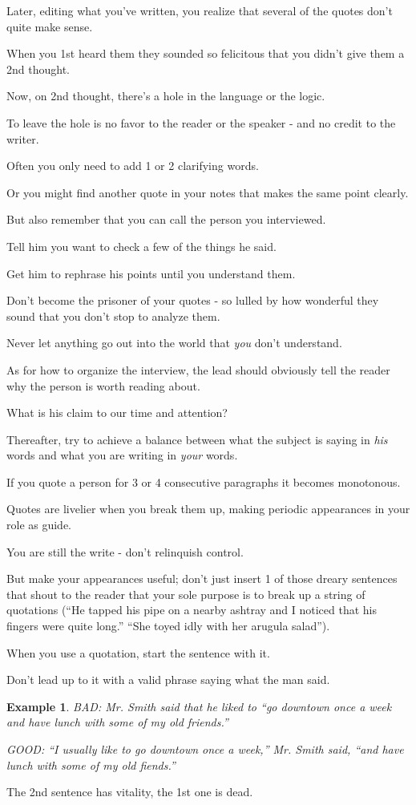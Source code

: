 \documentclass{book}
\numberwithin{equation}{section}
\newtheorem{example}{Example}[chapter]
\begin{document}
Later, editing what you've written, you realize that several of the quotes don't quite make sense.

When you 1st heard them they sounded so felicitous that you didn't give them a 2nd thought.

Now, on 2nd thought, there's a hole in the language or the logic.

To leave the hole is no favor to the reader or the speaker - and no credit to the writer.

Often you only need to add 1 or 2 clarifying words.

Or you might find another quote in your notes that makes the same point clearly.

But also remember that you can call the person you interviewed.

Tell him you want to check a few of the things he said.

Get him to rephrase his points until you understand them.

Don't become the prisoner of your quotes - so lulled by how wonderful they sound that you don't stop to analyze them.

Never let anything go out into the world that \textit{you} don't understand.

%
As for how to organize the interview, the lead should obviously tell the reader why the person is worth reading about.

What is his claim to our time and attention?

Thereafter, try to achieve a balance between what the subject is saying in \textit{his} words and what you are writing in \textit{your} words.

If you quote a person for 3 or 4 consecutive paragraphs it becomes monotonous.

Quotes are livelier when you break them up, making periodic appearances in your role as guide.

You are still the write - don't relinquish control.

But make your appearances useful; don't just insert 1 of those dreary sentences that shout to the reader that your sole purpose is to break up a string of quotations (``He tapped his pipe on a nearby ashtray and I noticed that his fingers were quite long.'' ``She toyed idly with her arugula salad'').

%
When you use a quotation, start the sentence with it.

Don't lead up to it with a valid phrase saying what the man said.
\begin{example}
    BAD: Mr. Smith said that he liked to ``go downtown once a week and have lunch with some of my old friends.''
    
    GOOD: ``I usually like to go downtown once a week,'' Mr. Smith said, ``and have lunch with some of my old fiends.''
\end{example}
The 2nd sentence has vitality, the 1st one is dead.
\end{document}

